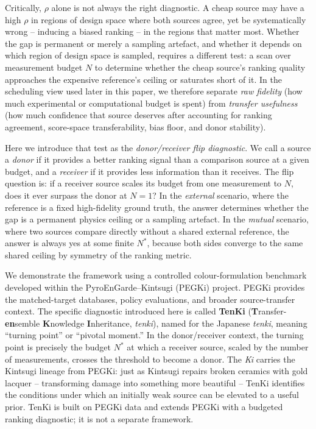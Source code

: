 \documentclass[twoside,twocolumn,9pt]{article}
\begin{document}
Critically, $\rho$ alone is not always the right diagnostic. A cheap source may have a high $\rho$ in regions of design space where both sources agree, yet be systematically wrong -- inducing a biased ranking -- in the regions that matter most. Whether the gap is permanent or merely a sampling artefact, and whether it depends on which region of design space is sampled, requires a different test: a scan over measurement budget $N$ to determine whether the cheap source's ranking quality approaches the expensive reference's ceiling or saturates short of it. In the scheduling view used later in this paper, we therefore separate \emph{raw fidelity} (how much experimental or computational budget is spent) from \emph{transfer usefulness} (how much confidence that source deserves after accounting for ranking agreement, score-space transferability, bias floor, and donor stability).

Here we introduce that test as the \emph{donor/receiver flip diagnostic}. We call a source a \emph{donor} if it provides a better ranking signal than a comparison source at a given budget, and a \emph{receiver} if it provides less information than it receives. The flip question is: if a receiver source scales its budget from one measurement to $N$, does it ever surpass the donor at $N=1$? In the \emph{external} scenario, where the reference is a fixed high-fidelity ground truth, the answer determines whether the gap is a permanent physics ceiling or a sampling artefact. In the \emph{mutual} scenario, where two sources compare directly without a shared external reference, the answer is always yes at some finite $N^*$, because both sides converge to the same shared ceiling by symmetry of the ranking metric.

We demonstrate the framework using a controlled colour-formulation benchmark developed within the PyroEnGarde--Kintsugi (PEGKi) project.\cite{Ackolf2025PEGKi} PEGKi provides the matched-target databases, policy evaluations, and broader source-transfer context. The specific diagnostic introduced here is called \textbf{TenKi} (\textbf{T}ransfer-\textbf{en}semble \textbf{K}nowledge \textbf{I}nheritance, \textit{tenki}), named for the Japanese \textit{tenki}, meaning ``turning point'' or ``pivotal moment.'' In the donor/receiver context, the turning point is precisely the budget $N^*$ at which a receiver source, scaled by the number of measurements, crosses the threshold to become a donor. The \textit{Ki} carries the Kintsugi lineage from PEGKi: just as Kintsugi repairs broken ceramics with gold lacquer -- transforming damage into something more beautiful -- TenKi identifies the conditions under which an initially weak source can be elevated to a useful prior. TenKi is built on PEGKi data and extends PEGKi with a budgeted ranking diagnostic; it is not a separate framework.
\end{document}
